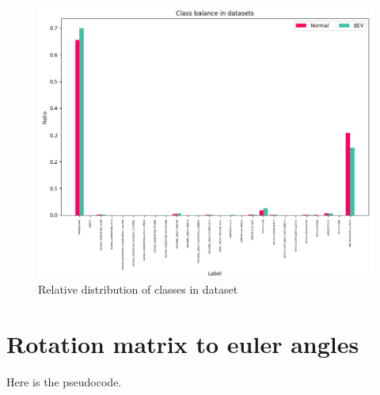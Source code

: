 \begin{figure}[h!]
    \centering
    \includegraphics[width=\linewidth]{images/appendix/dataset_class_balance_ratio.png}
    \caption{Relative distribution of classes in dataset}
    \label{fig:dataset_class_balance_ratio}
\end{figure}

\section{Rotation matrix to euler angles}
Here \cite{euler_from_matrix} is the pseudocode.

